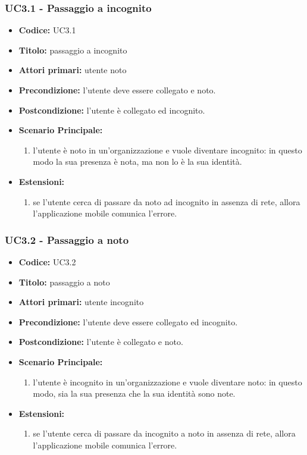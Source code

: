 \documentclass[../analisi-dei-requisiti]{subfiles}
\begin{document}
\subsubsection{UC3.1 - Passaggio a incognito}
\label{sub:uc3.1utente}
\begin{itemize}
  \item \textbf{Codice:} UC3.1
  \item \textbf{Titolo:} passaggio a incognito
  \item \textbf{Attori primari:} utente noto
  \item \textbf{Precondizione:} l'utente deve essere collegato e noto.
  \item \textbf{Postcondizione:} l'utente è collegato ed incognito.
  \item \textbf{Scenario Principale:}
  \begin{enumerate}
    \item l'utente è noto in un'organizzazione e vuole diventare incognito: in questo modo la sua presenza è nota, ma non lo è la sua identità.
  \end{enumerate}
  \item \textbf{Estensioni:} 
  \begin{enumerate}
    \item se l'utente cerca di passare da noto ad incognito in assenza di rete, allora l'applicazione mobile comunica l'errore.
  \end{enumerate}
\end{itemize}

\subsubsection{UC3.2 - Passaggio a noto}
\label{sub:uc3.2utente}
\begin{itemize}
  \item \textbf{Codice:} UC3.2
  \item \textbf{Titolo:} passaggio a noto
  \item \textbf{Attori primari:} utente incognito
  \item \textbf{Precondizione:} l'utente deve essere collegato ed incognito.
  \item \textbf{Postcondizione:} l'utente è collegato e noto.
  \item \textbf{Scenario Principale:}
  \begin{enumerate}
    \item l'utente è incognito in un'organizzazione e vuole diventare noto: in questo modo, sia la sua presenza che la sua identità sono note.
  \end{enumerate}
  \item \textbf{Estensioni:} 
  \begin{enumerate}
    \item se l'utente cerca di passare da incognito a noto in assenza di rete, allora l'applicazione mobile comunica l'errore.
  \end{enumerate}
\end{itemize}
\end{document}
